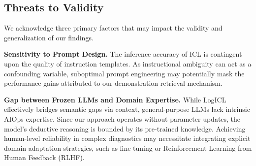 \documentclass[lettersize,journal]{IEEEtran}
\begin{document}

\subsection{Threats to Validity}
We acknowledge three primary factors that may impact the validity and generalization of our findings.

\textbf{Sensitivity to Prompt Design.} The inference accuracy of ICL is contingent upon the quality of instruction templates. As instructional ambiguity can act as a confounding variable, suboptimal prompt engineering may potentially mask the performance gains attributed to our demonstration retrieval mechanism.

\textbf{Gap between Frozen LLMs and Domain Expertise.} While LogICL effectively bridges semantic gaps via context, general-purpose LLMs lack intrinsic AIOps expertise. Since our approach operates without parameter updates, the model's deductive reasoning is bounded by its pre-trained knowledge. Achieving human-level reliability in complex diagnostics may necessitate integrating explicit domain adaptation strategies, such as fine-tuning or Reinforcement Learning from Human Feedback (RLHF).
\end{document}

